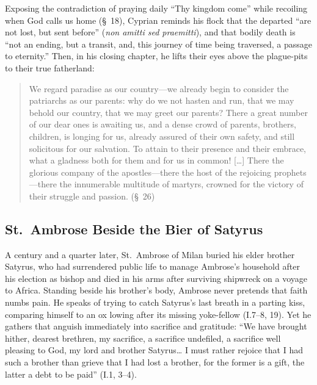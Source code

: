Exposing the contradiction of praying daily ``Thy kingdom come'' while recoiling when God calls us home (\S~18), Cyprian reminds his flock that the departed ``are not lost, but sent before'' (\emph{non amitti sed praemitti}), and that bodily death is ``not an ending, but a transit, and, this journey of time being traversed, a passage to eternity.'' Then, in his closing chapter, he lifts their eyes above the plague-pits to their true fatherland:

\begin{quote}
We regard paradise as our country---we already begin to consider the patriarchs as our parents: why do we not hasten and run, that we may behold our country, that we may greet our parents? There a great number of our dear ones is awaiting us, and a dense crowd of parents, brothers, children, is longing for us, already assured of their own safety, and still solicitous for our salvation. To attain to their presence and their embrace, what a gladness both for them and for us in common! [\ldots] There the glorious company of the apostles---there the host of the rejoicing prophets---there the innumerable multitude of martyrs, crowned for the victory of their struggle and passion. (\S~26)
\end{quote}

\subsection{St.~Ambrose Beside the Bier of Satyrus}

A century and a quarter later, St.~Ambrose of Milan buried his elder brother Satyrus, who had surrendered public life to manage Ambrose's household after his election as bishop and died in his arms after surviving shipwreck on a voyage to Africa. Standing beside his brother's body, Ambrose never pretends that faith numbs pain. He speaks of trying to catch Satyrus's last breath in a parting kiss, comparing himself to an ox lowing after its missing yoke-fellow (I.7--8, 19). Yet he gathers that anguish immediately into sacrifice and gratitude: ``We have brought hither, dearest brethren, my sacrifice, a sacrifice undefiled, a sacrifice well pleasing to God, my lord and brother Satyrus\ldots{} I must rather rejoice that I had such a brother than grieve that I had lost a brother, for the former is a gift, the latter a debt to be paid'' (I.1, 3--4).

